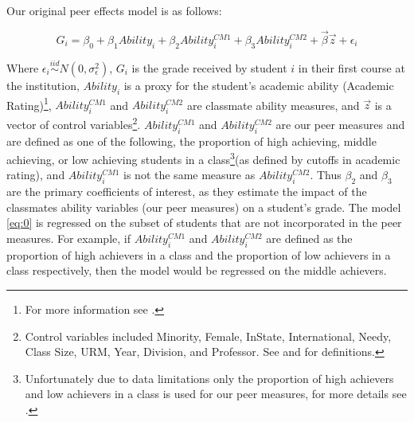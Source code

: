 Our original peer effects model is as follows:
\setlength{\belowdisplayskip}{6pt} \setlength{\belowdisplayshortskip}{1pt}
\setlength{\abovedisplayskip}{-4pt} \setlength{\abovedisplayshortskip}{1pt}

\begin{equation}\label{eq:0}
G_{i} = \beta_{0} + \beta_{1} Ability_{i} + \beta_{2} Ability_{i}^{CM1} + \beta_{3} Ability_{i}^{CM2} + \overrightarrow{\beta} \overrightarrow{z} + \epsilon_{i}
\end{equation}

Where $\epsilon_{i} \stackrel{iid}{\sim} N(0,\sigma_{\epsilon}^2)$, $G_{i}$ is the grade received by student $i$ in their first course at the institution, $Ability_{i}$ is a proxy for the student's academic ability (Academic Rating)\footnote{For more information see .}, $Ability_{i}^{CM1}$ and $Ability_{i}^{CM2}$ are classmate ability measures, and $\overrightarrow{z}$ is a vector of control variables\footnote{Control variables included Minority, Female, InState, International, Needy, Class Size, URM, Year, Division, and Professor. See  and  for definitions.}. 
$Ability_{i}^{CM1}$ and $Ability_{i}^{CM2}$ are our peer measures and are defined as one of the following, the proportion of high achieving, middle achieving, or low achieving students in a class\footnote{Unfortunately due to data limitations only the proportion of high achievers and low achievers in a class is used for our peer measures, for more details see .}(as defined by cutoffs in academic rating), and $Ability_{i}^{CM1}$ is not the same measure as  $Ability_{i}^{CM2}$. 
Thus $\beta_{2}$ and $\beta_{3}$ are the primary coefficients of interest, as they estimate the impact of the classmates ability variables (our peer measures) on a student's grade. 
The model \eqref{eq:0} is regressed on the subset of students that are not incorporated in the peer measures. 
For example, if $Ability_{i}^{CM1}$ and $Ability_{i}^{CM2}$ are defined as the proportion of high achievers in a class and the proportion of low achievers in a class respectively, then the model would be regressed on the middle achievers. 

